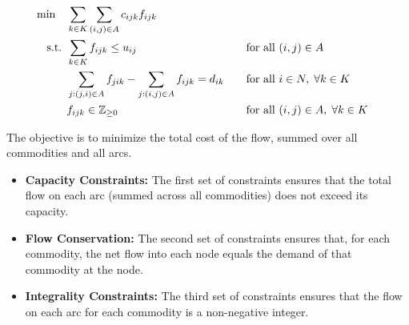 \begin{align*}
\min \quad & \sum_{k \in K} \sum_{(i, j) \in A} c_{ijk} f_{ijk} \\
\mbox{ s.t. }        & \sum_{k \in K} f_{ijk} \leq u_{ij} &&\quad \mbox{for all } (i, j) \in A \\
& \sum_{j:(j, i) \in A} f_{jik} - \sum_{j:(i, j) \in A} f_{ijk} = d_{ik} &&\quad \mbox{for all } i \in N, \; \forall k \in K \\
& f_{ijk} \in \mathbb{Z}_{\geq 0} &&\quad \mbox{for all } (i, j) \in A, \; \forall k \in K
\end{align*}

The objective is to minimize the total cost of the flow, summed over all commodities and all arcs.

\begin{itemize}
\item \textbf{Capacity Constraints:} The first set of constraints ensures that the total flow on each arc (summed across all commodities) does not exceed its capacity.
\item \textbf{Flow Conservation:} The second set of constraints ensures that, for each commodity, the net flow into each node equals the demand of that commodity at the node.
\item \textbf{Integrality Constraints:} The third set of constraints ensures that the flow on each arc for each commodity is a non-negative integer.
\end{itemize}


